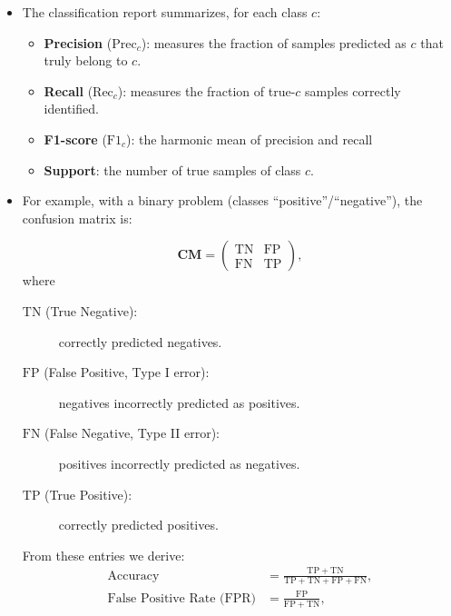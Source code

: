 \begin{flushleft}
	\begin{itemize}
		\item The classification report summarizes, for each class \(c\):
		      \begin{itemize}
			      \item \textbf{Precision} (\(\mathrm{Prec}_c\)): measures the fraction of samples predicted as \(c\) that truly belong to \(c\).
			      \item \textbf{Recall} (\(\mathrm{Rec}_c\)): measures the fraction of true-\(c\) samples correctly identified.
			      \item \textbf{F1-score} (\(\mathrm{F1}_c\)): the harmonic mean of precision and recall
			      \item \textbf{Support}: the number of true samples of class \(c\).
		      \end{itemize}
		\item For example, with a binary problem (classes “positive”/“negative”), the confusion matrix is:
		      \begin{flushleft}
			      \[
				      \mathbf{CM} =
				      \begin{pmatrix}
					      \mathrm{TN} & \mathrm{FP} \\
					      \mathrm{FN} & \mathrm{TP}
				      \end{pmatrix},
			      \]
			      where
			      \begin{description}
				      \item[\(\mathrm{TN}\) (True Negative):] correctly predicted negatives.
				      \item[\(\mathrm{FP}\) (False Positive, Type I error):] negatives incorrectly predicted as positives.
				      \item[\(\mathrm{FN}\) (False Negative, Type II error):] positives incorrectly predicted as negatives.
				      \item[\(\mathrm{TP}\) (True Positive):] correctly predicted positives.
			      \end{description}
			      \noindent From these entries we derive:
			      \begin{align*}
				      \text{Accuracy}                  & = \frac{\mathrm{TP} + \mathrm{TN}}{\mathrm{TP} + \mathrm{TN} + \mathrm{FP} + \mathrm{FN}}, \\
				      \text{False Positive Rate (FPR)} & = \frac{\mathrm{FP}}{\mathrm{FP} + \mathrm{TN}},                                           \\

\end{align*}
\end{flushleft}
\end{itemize}
\end{flushleft}
